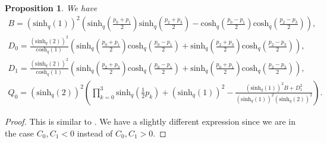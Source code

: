 \documentclass[pdftex]{sigma}
\numberwithin{equation}{section}
\newtheorem{Proposition}[Theorem]{Proposition}
 { \theoremstyle{definition}
\newtheorem{Definition}[Theorem]{Definition}
\newtheorem{Note}[Theorem]{Note}
\newtheorem{Example}[Theorem]{Example}
\newtheorem{Remark}[Theorem]{Remark} }
\newcommand{\chq}{\mathrm{cosh}_q}
\newcommand{\half}{\frac{1}{2}}
\newcommand{\shq}{\mathrm{sinh}_q}
\begin{document}
\begin{Proposition}\label{prop:BDQpk}
	We have
	\begin{gather*}
		B = (\shq(1))^2\!\left(\! \shq\!\left(\frac{p_0+p_1}{2}\right)\shq\!\left(\frac{p_2+p_3}{2}\right)- \chq\!\left(\frac{p_0-p_1}{2}\right)\chq\!\left(\frac{p_2-p_3}{2}\right)\right),\\
		D_0= \frac{(\shq(2))^2}{\chq(1)}\!\left(\!\shq\!\left(\frac{p_0+p_1}{2}\right)\chq\!\left(\frac{p_0-p_1}{2}\right)+\shq\!\left(\frac{p_2+p_3}{2}\right)\chq\!\left(\frac{p_2-p_3}{2}\right)\right),\\
		D_1= \frac{(\shq(2))^2}{\chq(1)}\!\left(\!\shq\!\left(\frac{p_2+p_3}{2}\right)\chq\!\left(\frac{p_0-p_1}{2}\right)+\shq\!\left(\frac{p_0+p_1}{2}\right)\chq\!\left(\frac{p_2-p_3}{2}\right)\right),\\
		Q_0=(\shq(2))^2\!\left( \prod_{k=0}^3\shq\!\left(\half p_k\right) + (\shq(1))^2 -\frac{(\shq(1))^2B+D_1^2}{(\shq(1))^2(\shq(2))^2}\right).
	\end{gather*}
\end{Proposition}
\begin{proof}This is similar to \cite[equation~(2.4)]{Zhedanov1991}. We have a slightly different expression since we are in the case $C_0,C_1 <0$ instead of $C_0,C_1 >0$.
\end{proof}
\end{document}
